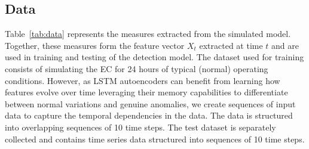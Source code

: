 

\subsection{Data}

Table~\ref{tab:data} represents the measures extracted from the simulated model. Together, these measures form the feature vector $X_t$ extracted at time $t$ and are used in training and testing of the detection model. The dataset used for training consists of simulating the EC for 24 hours of typical (normal) operating conditions. %
However, as LSTM autoencoders can benefit from learning how features evolve over time leveraging their memory capabilities to differentiate between normal variations and genuine anomalies, we create sequences of input data to capture the temporal dependencies in the data. The data is structured into overlapping sequences of 10 time steps.%
 The test dataset is separately collected and contains time series data structured into sequences of 10 time steps.



